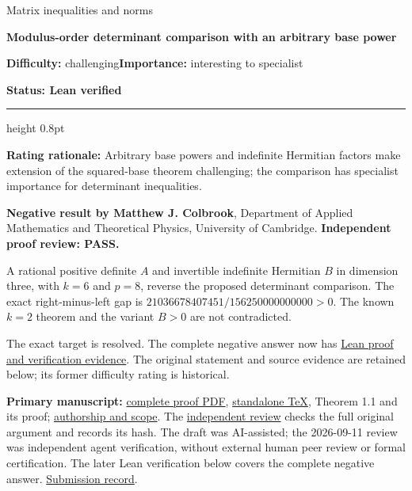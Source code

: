 \documentclass[11pt,a4paper]{article}
\makeatletter
\renewcommand{\subsection}{\Needspace{4\baselineskip}\@startsection{subsection}{2}{0pt}{9pt plus 1pt minus 1pt}{3pt}{\sffamily\bfseries\normalsize\color{ink}}}
\makeatother
\begin{document}
{\sffamily\small\color{muted}Matrix inequalities and norms\par}
\vspace{3pt}
{\raggedright{}\sffamily\bfseries\fontsize{21}{24}\selectfont\color{ink}Modulus-order
determinant comparison with an arbitrary base power\par}
\vspace{7pt}
{\sffamily\small\textbf{Difficulty:} challenging\quad\textbf{Importance:} interesting
to specialist\par}
{\sffamily\small\bfseries\color{accent}Status: Lean verified\par}
\vspace{4pt}
{\color{accent}\hrule height 0.8pt}
\vspace{6pt}
\textbf{Rating rationale:} Arbitrary base powers and indefinite
Hermitian factors make extension of the squared-base theorem
challenging; the comparison has specialist importance for determinant
inequalities.

\subsection{Resolution --- 2026-09-11}\label{resolution-2026-09-11}

\textbf{Negative result by Matthew J. Colbrook}, Department of Applied
Mathematics and Theoretical Physics, University of Cambridge.
\textbf{Independent proof review: PASS.}

A rational positive definite \(A\) and invertible indefinite Hermitian
\(B\) in dimension three, with \(k=6\) and \(p=8\), reverse the proposed
determinant comparison. The exact right-minus-left gap is
\(21036678407451/156250000000000>0\). The known \(k=2\) theorem and the
variant \(B>0\) are not contradicted.

The exact target is resolved. The complete negative answer now has
\href{https://github.com/ajt60gaibb/OpenProblemsInNLA/blob/main/matrix-inequalities-and-norms/MI-29\#lean-proof-and-verification-evidence--2026-09-12}{Lean
proof and verification evidence}. The original statement and source
evidence are retained below; its former difficulty rating is historical.

\textbf{Primary manuscript:}
\href{https://github.com/ajt60gaibb/OpenProblemsInNLA/blob/main/matrix-inequalities-and-norms/MI-29/solution.pdf}{complete
proof PDF},
\href{https://github.com/ajt60gaibb/OpenProblemsInNLA/blob/main/matrix-inequalities-and-norms/MI-29/solution.tex}{standalone
TeX}, Theorem 1.1 and its proof;
\href{https://github.com/ajt60gaibb/OpenProblemsInNLA/blob/main/matrix-inequalities-and-norms/MI-29/solution.md}{authorship
and scope}. The
\href{https://github.com/ajt60gaibb/OpenProblemsInNLA/blob/main/references/colbrook-matrix-2026-09-11/verification/reviews/MI-29-review.md}{independent
review} checks the full original argument and records its hash. The
draft was AI-assisted; the 2026-09-11 review was independent agent
verification, without external human peer review or formal
certification. The later Lean verification below covers the complete
negative answer.
\href{https://github.com/ajt60gaibb/OpenProblemsInNLA/blob/main/references/colbrook-matrix-2026-09-11/README.md}{Submission
record}.
\end{document}
